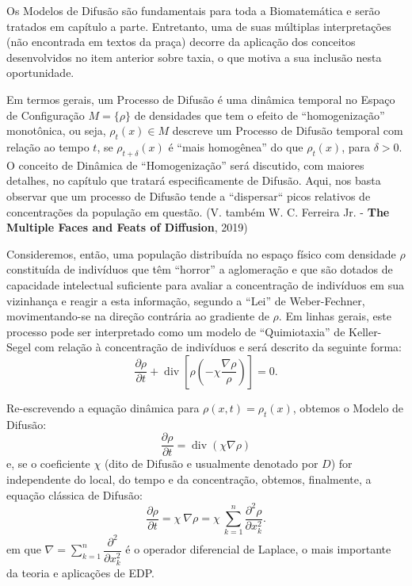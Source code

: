 Os Modelos de Difusão são fundamentais para toda a Biomatemática e serão tratados em capítulo a parte. Entretanto, uma de suas múltiplas interpretações (não encontrada em textos da praça) decorre da aplicação dos conceitos desenvolvidos no item anterior sobre taxia, o que motiva a sua inclusão nesta oportunidade.

Em termos gerais, um Processo de Difusão é uma dinâmica temporal no Espaço de Configuração \(M = \{\rho\}\) de densidades que tem o efeito de ``homogenização'' monotônica, ou seja, \(\rho_t(x) \in M\) descreve um Processo de Difusão temporal com relação ao tempo \(t\), se \(\rho_{t+\delta}(x)\) é ``mais homogênea'' do que \(\rho_t(x)\), para \(\delta > 0\). O conceito de Dinâmica de ``Homogenização'' será discutido, com maiores detalhes, no capítulo que tratará especificamente de Difusão. Aqui, nos basta observar que um processo de Difusão tende a ``dispersar`` picos relativos de concentrações da população em questão. (V. também W. C. Ferreira Jr. - \textbf{The Multiple Faces and Feats of Diffusion}, 2019)

Consideremos, então, uma população distribuída no espaço físico com densidade \(\rho\) constituída de indivíduos que têm ``horror'' a aglomeração e que são dotados de capacidade intelectual suficiente para avaliar a concentração de indivíduos em sua vizinhança e reagir a esta informação, segundo a ``Lei'' de Weber-Fechner, movimentando-se na direção contrária ao gradiente de \(\rho\). Em linhas gerais, este processo pode ser interpretado como um modelo de ``Quimiotaxia'' de Keller-Segel com relação à concentração de indivíduos e será descrito da seguinte forma:
\begin{equation}
\dfrac{\partial \rho}{\partial t} + \operatorname{div}\left[\rho\left(-\chi \dfrac{\nabla\rho}{\rho}\right)\right] = 0.
\end{equation}

Re-escrevendo a equação dinâmica para \(\rho(x,t) = \rho_t(x)\), obtemos o Modelo de Difusão:
\begin{equation}
\dfrac{\partial \rho}{\partial t} = \operatorname{div} \left(\chi\nabla\rho\right)
\end{equation}
e, se o coeficiente \(\chi\) (dito de Difusão e usualmente denotado por \(D\)) for independente do local, do tempo e da concentração, obtemos, finalmente, a equação clássica de Difusão:
\begin{equation}
\dfrac{\partial \rho}{\partial t}
= \chi\ \nabla \rho
= \chi\ \sum_{k=1}^{n} \dfrac{\partial^2 \rho}{\partial x_k^2}.
\end{equation}
em que \(\nabla = \displaystyle\sum_{k=1}^{n} \dfrac{\partial^2}{\partial x_k^2}\) é o operador diferencial de Laplace, o mais importante da teoria e aplicações de EDP.

